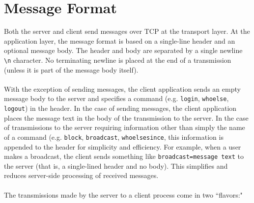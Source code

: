 \documentclass[12pt,a4paper]{article}
\begin{document}
\section{Message Format}
\label{sec:msg_format}

Both the server and client send messages over TCP at the transport layer. At the application layer, the message format is based on a single-line header and an optional message body. The header and body are separated by a single newline \verb|\n| character. No terminating newline is placed at the end of a transmission (unless it is part of the message body itself).
\\\\
With the exception of sending messages, the client application sends an empty message body to the server and specifies a command (e.g. \verb|login|, \verb|whoelse|, \verb|logout|) in the header. In the case of sending messages, the client application places the message text in the body of the transmission to the server. In the case of transmissions to the server requiring information other than simply the name of a command (e.g. \verb|block|, \verb|broadcast|, \verb|whoelsesince|, this information is appended to the header for simplicity and efficiency. For example, when a user makes a broadcast, the client sends something like \verb|broadcast=message text| to the server (that is, a single-lined header and no body). This simplifies and reduces server-side processing of received messages.
\\\\
The transmissions made by the server to a client process come in two ``flavors:"
\end{document}
